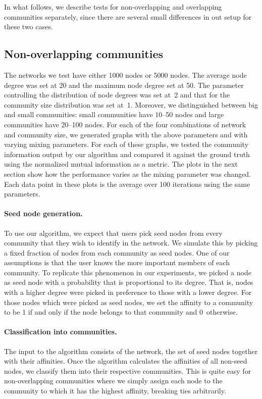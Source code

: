 In what follows, we describe tests for non-overlapping and overlapping communities separately, since 
there are several small differences in out setup for these two cases. 

\subsection{Non-overlapping communities}
The networks we test have either 1000 nodes or 5000 nodes. The average node degree
was set at 20 and the maximum node degree set at 50. The parameter controlling the 
distribution of node degrees was set at~2 and that for the community size distribution was 
set at~1. Moreover, we distinguished between big and small communities: small communities have 
10--50 nodes and large communities have 20--100 nodes. 
For each of the four combinations of network and community size, we generated graphs with the 
above parameters and with varying mixing parameters. For each of these graphs, we tested the 
community information output by our algorithm and compared it against the ground truth 
using the normalized mutual information as a metric. The plots in the next section 
show how the performance varies as the mixing parameter was changed. Each data point in 
these plots is the average over 100 iterations using the same parameters. 

\paragraph{Seed node generation.} 
To use our algorithm, we expect that users pick seed nodes from 
every community that they wish to identify in the network. 
We simulate this by picking a fixed fraction of nodes from each community as seed nodes.
One of our assumptions is that the user knows the more important members of each community. 
To replicate this phenomenon in our experiments, we picked a node as seed node
with a probability that is proportional to its degree.
That is, nodes with a higher degree were picked in preference to those with a lower degree.
For those nodes which were picked as seed nodes, we set the affinity to a community to be 1 if 
and only if the node belongs to that community and 0~otherwise.

\paragraph{Classification into communities.}
The input to the algorithm consists of the network, the set of seed nodes together with their 
affinities. Once the algorithm calculates the affinities of all non-seed nodes, we classify 
them into their respective communities. This is quite easy for non-overlapping 
communities where we simply assign each node to the community to which it has the 
highest affinity, breaking ties arbitrarily.

